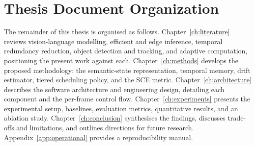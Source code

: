 \section{Thesis Document Organization}
\label{sec:intro-organization}

The remainder of this thesis is organised as follows.
Chapter~\ref{ch:literature} reviews vision-language modelling, efficient and
edge inference, temporal redundancy reduction, object detection and tracking,
and adaptive computation, positioning the present work against each.
Chapter~\ref{ch:methods} develops the proposed methodology: the semantic-state
representation, temporal memory, drift estimator, tiered scheduling policy,
and the SCE metric. Chapter~\ref{ch:architecture} describes the software
architecture and engineering design, detailing each component and the
per-frame control flow. Chapter~\ref{ch:experiments} presents the
experimental setup, baselines, evaluation metrics, quantitative results, and
an ablation study. Chapter~\ref{ch:conclusion} synthesises the findings,
discusses trade-offs and limitations, and outlines directions for future
research. Appendix~\ref{app:operational} provides a reproducibility manual.
